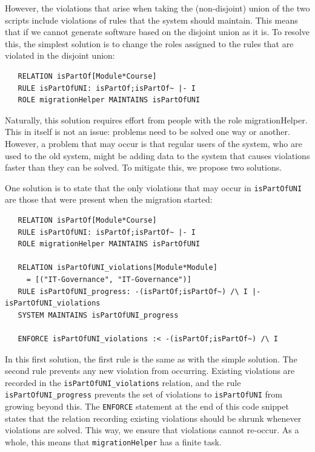 \documentclass{elsarticle}
\begin{document}
However, the violations that arise when taking the (non-disjoint) union of the two scripts include violations of rules that the system should maintain.
This means that if we cannot generate software based on the disjoint union as it is.
To resolve this, the simplest solution is to change the roles assigned to the rules that are violated in the disjoint union:
\begin{verbatim}
   RELATION isPartOf[Module*Course]
   RULE isPartOfUNI: isPartOf;isPartOf~ |- I
   ROLE migrationHelper MAINTAINS isPartOfUNI
\end{verbatim}

Naturally, this solution requires effort from people with the role migrationHelper.
This in itself is not an issue: problems need to be solved one way or another.
However, a problem that may occur is that regular users of the system, who are used to the old system, might be adding data to the system that causes violations faster than they can be solved.
To mitigate this, we propose two solutions.

One solution is to state that the only violations that may occur in \verb=isPartOfUNI= are those that were present when the migration started:
\begin{verbatim}
   RELATION isPartOf[Module*Course]
   RULE isPartOfUNI: isPartOf;isPartOf~ |- I
   ROLE migrationHelper MAINTAINS isPartOfUNI
   
   RELATION isPartOfUNI_violations[Module*Module]
     = [("IT-Governance", "IT-Governance")]
   RULE isPartOfUNI_progress: -(isPartOf;isPartOf~) /\ I |- isPartOfUNI_violations
   SYSTEM MAINTAINS isPartOfUNI_progress
   
   ENFORCE isPartOfUNI_violations :< -(isPartOf;isPartOf~) /\ I  
\end{verbatim}

In this first solution, the first rule is the same as with the simple solution.
The second rule prevents any new violation from occurring.
Existing violations are recorded in the \verb=isPartOfUNI_violations= relation, and the rule \verb=isPartOfUNI_progress= prevents the set of violations to \verb=isPartOfUNI= from growing beyond this.
The \verb=ENFORCE= statement at the end of this code snippet states that the relation recording existing violations should be shrunk whenever violations are solved.
This way, we ensure that violations cannot re-occur.
As a whole, this means that \verb=migrationHelper= has a finite task.
\end{document}
